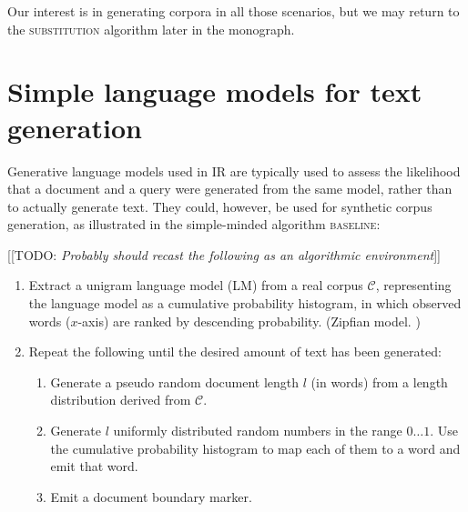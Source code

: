 \documentclass[11pt]{report}
\newcommand{\todo}[1]{{\color{blue}[[TODO: {\emph{#1}}]]}}
\newcommand{\script}[1]{$\mathcal{#1}$}
\begin{document}
Our interest is in generating corpora in all those scenarios, but we
may return to the \textsc{substitution} algorithm later in the monograph.


\section{Simple language models for text generation}
Generative language models used in IR are 
typically used to assess the likelihood that a document and a query
were generated from the same model, rather than to actually generate
text.  They could, however, be used for synthetic corpus generation,
as illustrated in the simple-minded algorithm \textsc{baseline}:  


\todo{Probably should recast the following as an algorithmic environment}
\begin{enumerate}
\item Extract a unigram language model (LM) from a real corpus \script{C}, 
representing the language model as a cumulative probability histogram,
in which observed words ($x$-axis) are ranked by descending probability.
(Zipfian model. \cite{zipf1949humanBehaviour})

\item Repeat the following until the desired amount of text has been generated:
\begin{enumerate}
\item Generate a pseudo random document length $l$ (in words) from a
  length distribution derived from \script{C}.
\item Generate $l$ uniformly distributed random numbers in the range 
  $0\ldots1$.  Use the cumulative
  probability histogram to map each of them to a word and emit that word.
\item Emit a document boundary marker.
\end{enumerate}
\end{enumerate}
\end{document}
